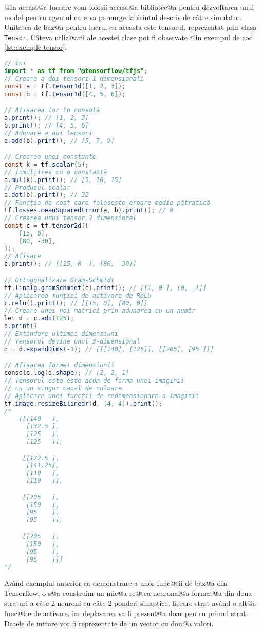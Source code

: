 @In aceast@a lucrare vom folosii aceast@a bibliotec@a pentru dezvoltarea unui model pentru agentul care va parcurge labirintul descris de c\^ atre simulator. Unitatea de baz@a pentru lucrul cu aceasta este tensorul, reprezentat prin clasa \texttt{Tensor}. C\^ ateva utliz@arii ale acestei clase pot fi observate @in exempul de cod \ref{lst:exemple-tensor}.

\begin{lstlisting}[language=Java, caption=Exemple de folosire a bibliotecii Tensorflow, label={lst:exemple-tensor}]
// Ini	
import * as tf from "@tensorflow/tfjs";
// Creare a doi tensori 1-dimensionali
const a = tf.tensor1d([1, 2, 3]);
const b = tf.tensor1d([4, 5, 6]);

// Afișarea lor în consolă
a.print(); // [1, 2, 3]
b.print(); // [4, 5, 6]
// Adunare a doi tensori
a.add(b).print(); // [5, 7, 9]

// Crearea unei constante
const k = tf.scalar(5);
// Înmulțirea cu o constantă
a.mul(k).print(); // [5, 10, 15]
// Produsul scalar
a.dot(b).print(); // 32
// Funcția de cost care folosește eroare medie pătratică
tf.losses.meanSquaredError(a, b).print(); // 9
// Crearea unui tensor 2 dimensional
const c = tf.tensor2d([
    [15, 0],
    [80, -30],
]);
// Afișare
c.print(); // [[15, 0  ], [80, -30]]

// Ortogonalizare Gram-Schmidt
tf.linalg.gramSchmidt(c).print(); // [[1, 0 ], [0, -1]]
// Aplicarea funției de activare de ReLU
c.relu().print(); // [[15, 0], [80, 0]]
// Creare unei noi matrici prin adunarea cu un număr
let d = c.add(125);
d.print()
// Extindere ultimei dimensiuni
// Tensorul devine unul 3-dimensional
d = d.expandDims(-1); // [[[140], [125]], [[205], [95 ]]]

// Afișarea formei dimensiunii
console.log(d.shape); // [2, 2, 1]
// Tensorul este este acum de forma unei imaginii
// cu un singur canal de culoare
// Aplicare unei funcții de redimensionare a imaginii
tf.image.resizeBilinear(d, [4, 4]).print();
/*
    [[[140   ],
      [132.5 ],
      [125   ],
      [125   ]],

     [[172.5 ],
      [141.25],
      [110   ],
      [110   ]],

     [[205   ],
      [150   ],
      [95    ],
      [95    ]],

     [[205   ],
      [150   ],
      [95    ],
      [95    ]]]
*/	
\end{lstlisting}

Av\^ and exemplul anterior ca demonstrare a unor func@tii de baz@a din Tensorflow, o s@a construim un mic@a re@tea neuronal@a format@a din doua straturi a c\^ ate 2 neuroni cu c\^ ate 2 ponderi sinaptice, fiecare strat av\^ and o alt@a func@tie de activare, iar deplasarea va fi prezent@a doar pentru primul strat. Datele de intrare vor fi reprezentate de un vector cu dou@a valori.

